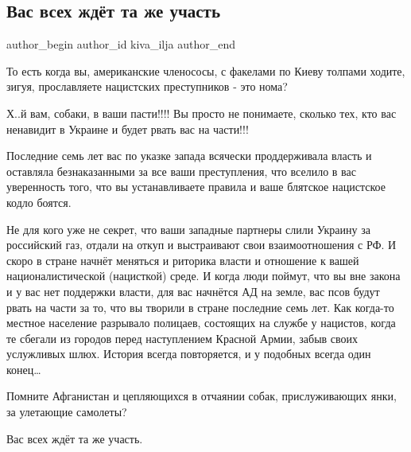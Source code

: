  
 
 
 
 
 
\subsection{Вас всех ждёт та же участь}
\label{sec:16_10_2021.fb.kiva_ilja.1.uchast_afganistan_ozhidanie}
 
\ifcmt
 author_begin
   author_id kiva_ilja
 author_end
\fi

То есть когда вы, американские членососы, с факелами по Киеву толпами ходите,
зигуя, прославляете нацистских преступников - это нома? 

Х..й вам, собаки, в ваши пасти!!!! Вы просто не понимаете, сколько тех, кто вас
ненавидит в Украине и будет рвать вас на части!!! 

Последние семь лет вас по указке запада всячески проддерживала власть и
оставляла безнаказанными за все ваши преступления, что вселило в вас
уверенность того, что вы устанавливаете правила и ваше блятское нацистское
кодло боятся. 

Не для кого уже не секрет, что ваши западные партнеры слили Украину за
российский газ, отдали на откуп и  выстраивают свои взаимоотношения с РФ. И
скоро в стране начнёт меняться и риторика власти и отношение к вашей
националистической (нацисткой) среде. И когда люди поймут, что вы вне закона и
у вас нет поддержки власти, для вас начнётся АД на земле, вас псов будут рвать
на части за то, что вы творили в стране последние семь лет. Как когда-то
местное население разрывало полицаев, состоящих на службе у нацистов, когда те
сбегали из городов перед наступлением Красной Армии, забыв своих услужливых
шлюх. История всегда повторяется, и у подобных всегда один конец…  

Помните Афганистан и цепляющихся в отчаянии собак, прислуживающих янки, за
улетающие самолеты?

Вас всех ждёт та же участь.
